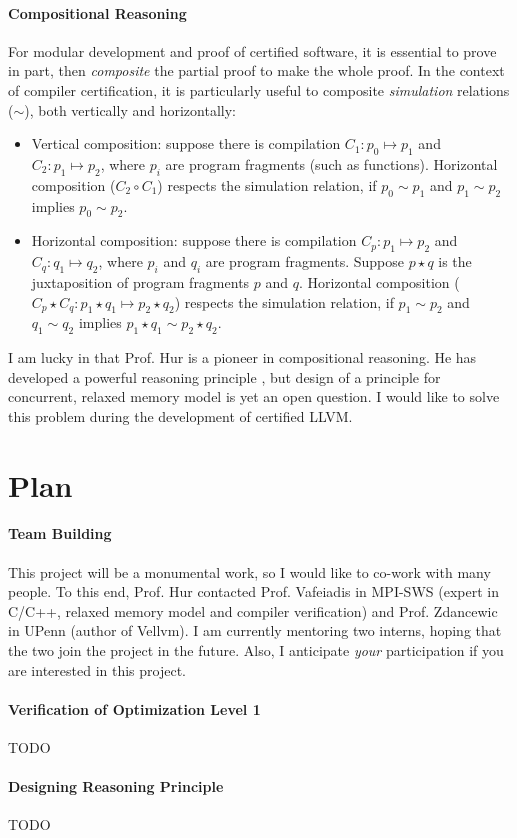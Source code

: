 \documentclass[nocopyrightspace]{sigplanconf}
\begin{document}
\paragraph{Compositional Reasoning}\label{sec:compose}

For modular development and proof of certified software, it is
essential to prove in part, then \emph{composite} the partial proof to
make the whole proof.  In the context of compiler certification, it is
particularly useful to composite \emph{simulation} relations ($\sim$),
both vertically and horizontally:
\begin{itemize}
\item Vertical composition: suppose there is compilation $C_1: p_0
  \mapsto p_1$ and $C_2: p_1 \mapsto p_2$, where $p_i$ are program
  fragments (such as functions).  Horizontal composition ($C_2 \circ
  C_1$) respects the simulation relation, if $p_0 \sim p_1$ and $p_1
  \sim p_2$ implies $p_0 \sim p_2$.
\item Horizontal composition: suppose there is compilation $C_p: p_1
  \mapsto p_2$ and $C_q: q_1 \mapsto q_2$, where $p_i$ and $q_i$ are
  program fragments.  Suppose $p \star q$ is the juxtaposition of
  program fragments $p$ and $q$.  Horizontal composition ($C_p \star
  C_q: p_1 \star q_1 \mapsto p_2 \star q_2$) respects the simulation
  relation, if $p_1 \sim p_2$ and $q_1 \sim q_2$ implies $p_1 \star
  q_1 \sim p_2 \star q_2$.
\end{itemize}

I am lucky in that Prof. Hur is a pioneer in compositional reasoning.
He has developed a powerful reasoning principle \cite{TODO}, but
design of a principle for concurrent, relaxed memory model is yet an
open question.  I would like to solve this problem during the
development of certified LLVM.

\section{Plan}

\paragraph{Team Building}
This project will be a monumental work, so I would like to co-work
with many people.  To this end, Prof. Hur contacted Prof. Vafeiadis in
MPI-SWS (expert in C/C++, relaxed memory model and compiler
verification) and Prof. Zdancewic in UPenn (author of Vellvm).  I am
currently mentoring two interns, hoping that the two join the project
in the future.  Also, I anticipate \emph{your} participation if you
are interested in this project.

\paragraph{Verification of Optimization Level 1}
TODO

\paragraph{Designing Reasoning Principle}
TODO






\end{document}
